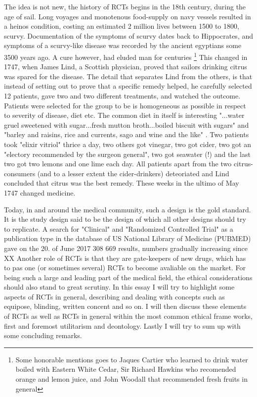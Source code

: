 \documentclass[12p]{article}
\begin{document}
The idea is not new, the history of RCTs begins in the 18th century, during the age of sail.
Long voyages and monotenous food-supply on navy vessels resulted in a heinos condition, costing an estimated 2 million lives between 1500 to 1800, scurvy.
Documentation of the symptoms of scurvy dates back to Hippocrates, and symptoms of a scurvy-like disease was recorded by the ancient egyptians some 3500 years ago.
A cure however, had eluded man for centuries \footnote{Some honorable mentions goes to Jaques Cartier who learned to drink water boiled with Eastern White Cedar, Sir Richard Hawkins who recomended orange and lemon juice, and John Woodall that recommended fresh fruits in general}
This changed in 1747, when James Lind, a Scottish physician, proved that sailors drinking citrus was spared for the disease.
The detail that separates Lind from the others, is that instead of setting out to prove that a specific remedy helped, he carefully selected 12 patients, gave two and two different treatments, and watched the outcome.
Patients were selected for the group to be is homogeneous as possible in respect to severity of disease, diet etc.
The common diet in itself is interesting "...water gruel sweetened with sugar...fresh mutton broth...boiled biscuit with sugars" and "barley and raisins, rice and currents, sago and wine and the like" \cite{RN3}.
Two patients took "elixir vitriol" thrice a day, two others got vinegar, two got cider, two got an "electory recommended by the surgeon general", two got seawater (!) and the last two got two lemons and one lime each day.
All patients apart from the two citrus-consumers (and to a lesser extent the cider-drinkers) deteoriated and Lind concluded that citrus was the best remedy.
These weeks in the ultimo of May 1747 changed medicine.

Today, in and around the medical community, such a design is the gold standard.
It is the study design said to be the design of which all other designs should try to replicate. 
A search for "Clinical" and "Randomized Controlled Trial" as a publication type in the database of US National Library of Medicine (PUBMED) gave on the 20. of June 2017 308 669 results, numbers gradually increasing since XX
Another role of RCTs is that they are gate-keepers of new drugs, which has to pas one (or sometimes several) RCTs to become avaliable on the market. 
For being such a large and leading part of the medical field, the ethical considerations should also stand to great scrutiny.
In this essay I will try to highlight some aspects of RCTs in general, describing and dealing with concepts such as equipose, blinding, written concent and so on.
I will then discuss these elements of RCTs as well as RCTs in general within the most common ethical frame works, first and foremost utilitarism and deontology. 
Lastly I will try to sum up with some concluding remarks.
\end{document}
